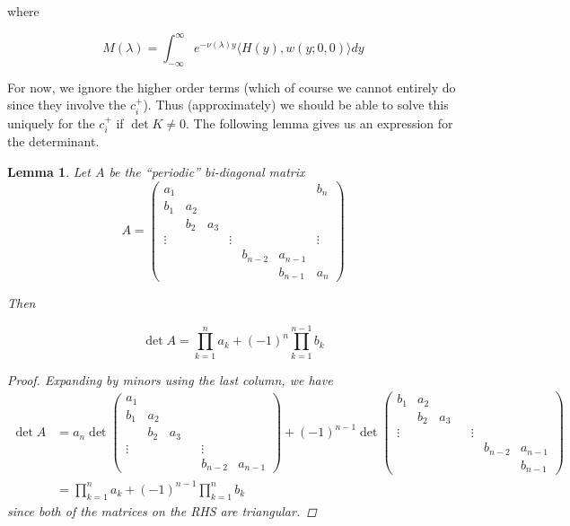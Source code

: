 \documentclass[12pt]{article}
\newtheorem{lemma}{Lemma}
\begin{document}
where

\[
M(\lambda) = \int_{-\infty}^\infty e^{-\nu(\lambda)y} \langle H(y), w(y; 0, 0) \rangle dy
\]

For now, we ignore the higher order terms (which of course we cannot entirely do since they involve the $c_i^+$). Thus (approximately) we should be able to solve this uniquely for the $c_i^+$ if $\det K \neq 0$. The following lemma gives us an expression for the determinant.

\begin{lemma}
Let $A$ be the ``periodic'' bi-diagonal matrix
\begin{equation}
A = \begin{pmatrix}
a_1 & & & & & & b_n \\
b_1 & a_2 \\
& b_2 & a_3 \\
\vdots & & & \vdots & &&  \vdots \\
& & & & b_{n-2} & a_{n-1} \\
& & & & & b_{n-1} & a_n
\end{pmatrix}
\end{equation}

Then 

\begin{equation}
\det{A} = \prod_{k = 1}^n a_k + (-1)^n \prod_{k = 1}^{n-1} b_k
\end{equation}

\begin{proof}
Expanding by minors using the last column, we have
\begin{align*}
\det A &= a_n \det
\begin{pmatrix}
a_1 \\
b_1 & a_2 \\
& b_2 & a_3 \\
\vdots & & & & \vdots \\
& & & & b_{n-2} & a_{n-1}
\end{pmatrix}
+ (-1)^{n-1} \det
\begin{pmatrix}
b_1 & a_2 \\
& b_2 & a_3 \\
\vdots & & & & \vdots \\
& & & & & b_{n-2} & a_{n-1} \\
& & & & & & b_{n-1}
\end{pmatrix} \\
&= \prod_{k = 1}^n a_k + (-1)^{n-1} \prod_{k = 1}^n b_k
\end{align*}
since both of the matrices on the RHS are triangular.
\end{proof}
\end{lemma}
\end{document}

